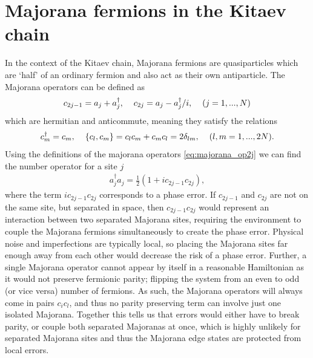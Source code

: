 \section{Majorana fermions in the Kitaev chain} \label{sec:Majorana_Fermions}
In the context of the Kitaev chain, Majorana fermions are quasiparticles which are `half' of an ordinary fermion and also act as their own antiparticle. The Majorana operators can be defined as
\begin{align}
    c_{2j-1} = a_j + a_j^\dagger, \hspace{4mm}  c_{2j} = \frac{a_j - a_j^\dagger}{i}, \hspace{4mm} (j = 1, ..., N) \label{eq:majorana_op2j}
\end{align}
which are hermitian and anticommute, meaning they satisfy the relations
\begin{align}
    c_m^\dagger = c_m, \hspace{4mm} \{c_l, c_m\} = c_l c_m + c_m c_l = 2 \delta_{lm}, \hspace{4mm} (l,m = 1, ..., 2N). \label{eq:Majorana_Herm_anticomm}
\end{align}
Using the definitions of the majorana operators \ref{eq:majorana_op2j} we can find the number operator for a site $j$
\begin{align}
    a_j^\dagger a_j = \frac{1}{2} \left(1 + i c_{2j-1} c_{2j} \right),
\end{align}
where the term $i c_{2j-1} c_{2j}$ corresponds to a phase error. If $c_{2j-1}$ and $c_{2j}$ are not on the same site, but separated in space, then $c_{2j-1} c_{2j}$ would represent an interaction between two separated Majorana sites, requiring the environment to couple the Majorana fermions simultaneously to create the phase error. Physical noise and imperfections are typically local, so placing the Majorana sites far enough away from each other would decrease the risk of a phase error. Further, a single Majorana operator cannot appear by itself in a reasonable Hamiltonian as it would not preserve fermionic parity; flipping the system from an even to odd (or vice versa) number of fermions. As such, the Majorana operators will always come in pairs $c_i c_l$, and thus no parity preserving term can involve just one isolated Majorana. Together this tells us that errors would either have to break parity, or couple both separated Majoranas at once, which is highly unlikely for separated Majorana sites and thus the Majorana edge states are protected from local errors.

